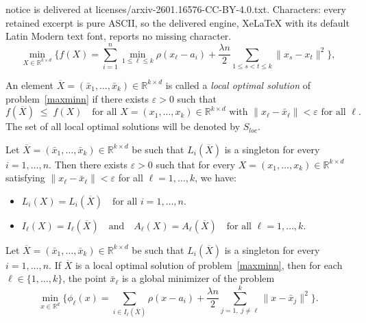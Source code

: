\documentclass[10pt,a4paper]{amsart}
\def\Bar{\overline}
\newcommand{\R}{\mathbb{R}}
\begin{document}
notice is delivered at licenses/arxiv-2601.16576-CC-BY-4.0.txt. Characters: every retained excerpt is pure ASCII, so the delivered engine, XeLaTeX with its default Latin Modern text font, reports no missing character.
\begin{equation}\label{maxminn}
	\min_{X\in\mathbb{R}^{k\times d}} \Biggl\{ f(X) = \sum_{i=1}^{n} \min_{1 \le \ell \le k} \rho(x_\ell - a_i) + \frac{\lambda n}{2} \sum_{1 \le s < t \le k} \|x_s - x_t\|^2 \Biggr\},
\end{equation}

\begin{definition}\label{deflocal}
An element $\Bar X=(\bar x_1,\dots,\bar x_k)\in\R^{k\times d}$ is called a
\emph{local optimal solution} of problem~\eqref{maxminn} if there exists
$\varepsilon>0$ such that
\[
f(\Bar X)\;\le\;f(X)
\quad
\text{for all }X=(x_1,\dots,x_k)\in\R^{k\times d}
\text{ with }\|x_\ell-\bar x_\ell\|<\varepsilon
\text{ for all }\ell.
\]
The set of all local optimal solutions will be denoted by $S_{loc}$.
\end{definition}

\begin{lemma}\label{lem:Li-stable}
Let $\Bar X=(\bar x_1,\dots,\bar x_k)\in\R^{k\times d}$ be such that
$L_i(\Bar X)$ is a singleton for every $i=1,\dots,n$. Then there exists
$\varepsilon>0$ such that for every
$X=(x_1,\dots,x_k)\in\R^{k\times d}$ satisfying
$\|x_\ell-\bar x_\ell\|<\varepsilon$ for all $\ell=1,\dots,k$, we have:
\begin{itemize}
    \item [\rm{(a)}] $L_i(X) = L_i(\Bar X)\quad\text{for all } i=1,\dots,n.$
    \item [\rm{(b)}] 
$I_\ell(X) = I_\ell(\Bar X)\quad\text{and}\quad A_\ell(X)=A_\ell(\Bar X)
\quad\text{for all } \ell=1,\dots,k.$
\end{itemize}
\end{lemma}

\begin{theorem}\label{thm:local}
Let $\Bar X=(\bar x_1,\dots,\bar x_k)\in\mathbb{R}^{k\times d}$ be such that $L_i(\Bar X)$ is a singleton for every $i=1,\dots,n$. If $\Bar X$ is a local optimal solution of problem~\eqref{maxminn}, then for each $\ell\in\{1,\dots,k\}$, the point $\bar x_\ell$ is a global minimizer of the problem
\begin{equation}\label{eq:phi-ell}
\min_{x\in\mathbb{R}^d} \Biggl\{
\phi_\ell(x) = \sum_{i\in I_\ell(\Bar X)}\rho(x-a_i) + \frac{\lambda n}{2} \sum_{j=1,\; j \neq \ell}^k \|x-\bar x_j\|^2
\Biggr\}.
\end{equation}
\end{theorem}
\end{document}
